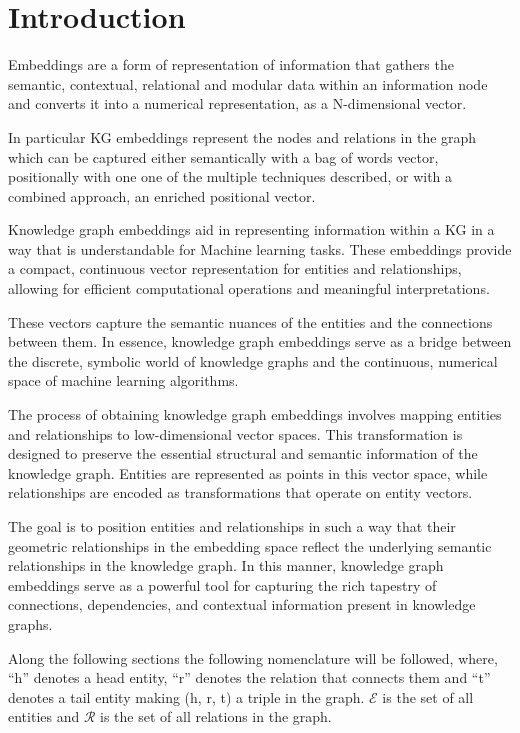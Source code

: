 \section{Introduction}\label{sec:emb-intro}
Embeddings are a form of representation of information that gathers the semantic, contextual, relational and modular data within an information node and converts it into a numerical representation, as a N-dimensional vector.

In particular KG embeddings represent the nodes and relations in the graph which can be captured either semantically with a bag of words vector, positionally with one one of the multiple techniques described, or with a combined approach, an enriched positional vector.

Knowledge graph embeddings aid in representing information within a KG in a way that is understandable for Machine learning tasks. These embeddings provide a compact, continuous vector representation for entities and relationships, allowing for efficient computational operations and meaningful interpretations.

These vectors capture the semantic nuances of the entities and the connections between them. In essence, knowledge graph embeddings serve as a bridge between the discrete, symbolic world of knowledge graphs and the continuous, numerical space of machine learning algorithms.

The process of obtaining knowledge graph embeddings involves mapping entities and relationships to low-dimensional vector spaces. This transformation is designed to preserve the essential structural and semantic information of the knowledge graph. Entities are represented as points in this vector space, while relationships are encoded as transformations that operate on entity vectors.

The goal is to position entities and relationships in such a way that their geometric relationships in the embedding space reflect the underlying semantic relationships in the knowledge graph. In this manner, knowledge graph embeddings serve as a powerful tool for capturing the rich tapestry of connections, dependencies, and contextual information present in knowledge graphs.

Along the following sections the following nomenclature will be followed, where, ``h'' denotes a head entity, ``r'' denotes the relation that connects them and ``t'' denotes a tail entity making (h, r, t) a triple in the graph. $\mathcal{E}$ is the set of all entities and $\mathcal{R}$ is the set of all relations in the graph.

